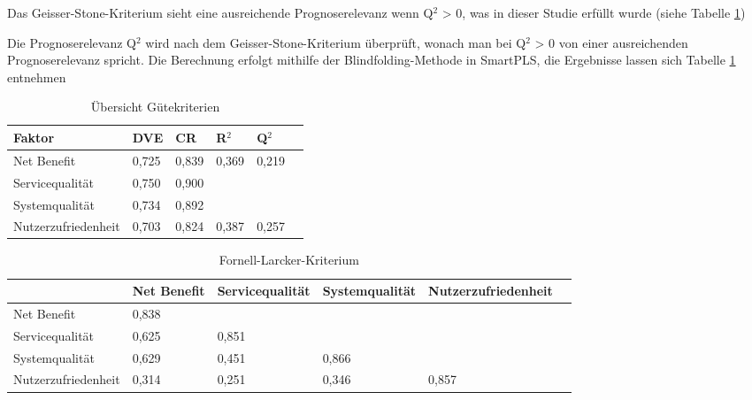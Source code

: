Das Geisser-Stone-Kriterium sieht eine ausreichende Prognoserelevanz wenn Q$^2$ > 0, was in dieser Studie erfüllt wurde (siehe Tabelle \ref{tab:Übersicht Gütekriterien}) 

Die Prognoserelevanz Q$^2$ wird nach dem Geisser-Stone-Kriterium überprüft, wonach man bei Q$^2$ > 0 von einer ausreichenden Prognoserelevanz spricht. Die Berechnung erfolgt mithilfe der Blindfolding-Methode in SmartPLS, die Ergebnisse lassen sich Tabelle \ref{tab:Übersicht Gütekriterien} entnehmen
 





\begin{table}[h] 
\caption{Übersicht Gütekriterien}
\label{tab:Übersicht Gütekriterien} 
\begin{tabular}{@{}llllll@{}} \toprule

\textbf{Faktor} & \textbf{DVE} & \textbf{CR} & \textbf{R$^2$} & \textbf{Q$^2$} \\ \midrule

 Net Benefit 		& 0,725 		& 0,839 & 0,369 & 0,219 		 \\
 
 Servicequalität 	& 0,750 		& 0,900 & 		& 			 \\

 Systemqualität 	& 0,734 		& 0,892 & 		& 			 \\

 Nutzerzufriedenheit & 0,703 	& 0,824 	& 0,387 	& 0,257		 \\ \bottomrule
\end{tabular}	
\end{table}



\begin{table}[h] 
\footnotesize
\caption{Fornell-Larcker-Kriterium}
\label{tab:Fornell-Larcker-Kriterium} 
\begin{tabular}{@{}llllll@{}} \toprule

 & \textbf{Net Benefit} & \textbf{Servicequalität} & \textbf{Systemqualität} & \textbf{Nutzerzufriedenheit} \\ \midrule

 Net Benefit 		& 0,838 		& 			& 		&  		\\
 
 Servicequalität 	& 0,625 		& 0,851 		& 		& 			\\

 Systemqualität 	& 0,629 		& 0,451 		& 0,866	& 			 \\

 Nutzerzufriedenheit & 0,314 	& 0,251 		& 0,346 	& 0,857		 	 \\ 
 
 \bottomrule
\end{tabular}	
\end{table}


